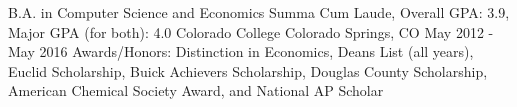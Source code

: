 


\begin{cventries}


\cventry
{B.A. in Computer Science and Economics Summa Cum Laude, Overall GPA: 3.9, Major GPA (for both): 4.0} %
{Colorado College} %
{Colorado Springs, CO} %
{May 2012 - May 2016} %
{Awards/Honors: Distinction in Economics, Deans List (all years), Euclid Scholarship, Buick Achievers Scholarship, Douglas County Scholarship, American Chemical Society Award, and National AP Scholar}


\end{cventries}